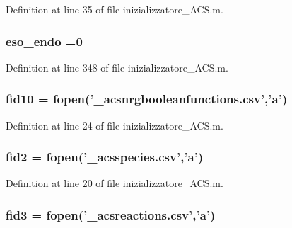 Definition at line 35 of file inizializzatore\-\_\-\-A\-C\-S.\-m.

\hypertarget{a00062_aad3b1a68f41f4a6fa247c1cf8e1d450a}{
\subsubsection[{eso\-\_\-endo}]{ eso\-\_\-endo =0}}\label{a00062_aad3b1a68f41f4a6fa247c1cf8e1d450a}


Definition at line 348 of file inizializzatore\-\_\-\-A\-C\-S.\-m.

\hypertarget{a00062_aadad4fd2d661ea2b9f0c3a95e3f7b4ba}{
\subsubsection[{fid10}]{\setlength{\rightskip}{0pt plus 5cm}fid10 = fopen('\-\_\-acsnrgbooleanfunctions.\-csv','{\bf a}')}}\label{a00062_aadad4fd2d661ea2b9f0c3a95e3f7b4ba}


Definition at line 24 of file inizializzatore\-\_\-\-A\-C\-S.\-m.

\hypertarget{a00062_a11af2c31c7926441f43875d99b4577d2}{
\subsubsection[{fid2}]{\setlength{\rightskip}{0pt plus 5cm}fid2 = fopen('\-\_\-acsspecies.\-csv','{\bf a}')}}\label{a00062_a11af2c31c7926441f43875d99b4577d2}


Definition at line 20 of file inizializzatore\-\_\-\-A\-C\-S.\-m.

\hypertarget{a00062_a153e3250d4161f9bea4c140498016d94}{
\subsubsection[{fid3}]{\setlength{\rightskip}{0pt plus 5cm}fid3 = fopen('\-\_\-acsreactions.\-csv','{\bf a}')}}\label{a00062_a153e3250d4161f9bea4c140498016d94}


